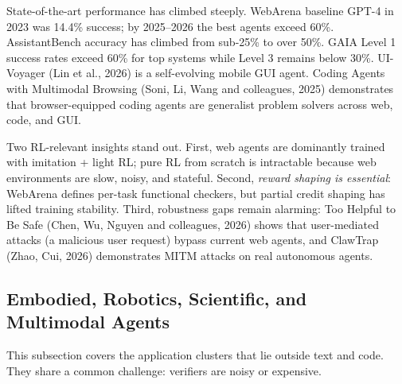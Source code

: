 State-of-the-art performance has climbed steeply. WebArena baseline GPT-4 in 2023 was 14.4\% success; by 2025--2026 the best agents exceed 60\%. AssistantBench accuracy has climbed from sub-25\% to over 50\%. GAIA Level 1 success rates exceed 60\% for top systems while Level 3 remains below 30\%. UI-Voyager (Lin et al., 2026) is a self-evolving mobile GUI agent. Coding Agents with Multimodal Browsing (Soni, Li, Wang and colleagues, 2025) demonstrates that browser-equipped coding agents are generalist problem solvers across web, code, and GUI.

Two RL-relevant insights stand out. First, web agents are dominantly trained with imitation + light RL; pure RL from scratch is intractable because web environments are slow, noisy, and stateful. Second, \emph{reward shaping is essential}: WebArena defines per-task functional checkers, but partial credit shaping has lifted training stability. Third, robustness gaps remain alarming: Too Helpful to Be Safe (Chen, Wu, Nguyen and colleagues, 2026) shows that user-mediated attacks (a malicious user request) bypass current web agents, and ClawTrap (Zhao, Cui, 2026) demonstrates MITM attacks on real autonomous agents.

\subsection{Embodied, Robotics, Scientific, and Multimodal Agents}\label{embodied-robotics-scientific-and-multimodal-agents}

This subsection covers the application clusters that lie outside text and code. They share a common challenge: verifiers are noisy or expensive.

